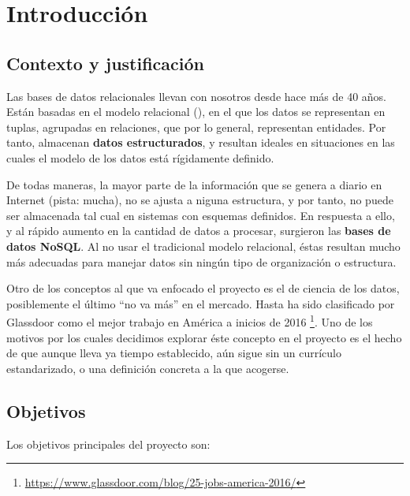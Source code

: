 \section{Introducción}
\label{sec:aim}

\subsection{Contexto y justificación}
\label{subsec:context}

Las bases de datos relacionales llevan con nosotros desde hace más de 40 años.
Están basadas en el modelo relacional (\cite{Codd:1970:RMD:362384.362685}), en el que los datos se representan en tuplas, agrupadas en
relaciones, que por lo general, representan entidades. Por tanto, almacenan
\textbf{datos estructurados}, y resultan ideales en situaciones en las cuales el
modelo de los datos está rígidamente definido.

De todas maneras, la mayor parte de la información que se genera a
diario en Internet (pista: mucha), no se ajusta a niguna estructura, y
por tanto, no puede ser almacenada tal cual en sistemas con esquemas definidos.
En respuesta a ello, y al rápido aumento en la cantidad de datos a procesar,
surgieron las \textbf{bases de datos NoSQL}. Al no usar el tradicional modelo
relacional, éstas resultan mucho más adecuadas para manejar datos sin ningún
tipo de organización o estructura. 

Otro de los conceptos al que va enfocado el proyecto es el de ciencia de los
datos, posiblemente el último ``no va más'' en el mercado. Hasta ha sido
clasificado por Glassdoor como el mejor trabajo en América a inicios de 2016
\footnote{\url{https://www.glassdoor.com/blog/25-jobs-america-2016/}}. Uno de
los motivos por los cuales decidimos explorar éste concepto en el proyecto es el
hecho de que aunque lleva ya tiempo establecido, aún sigue sin un currículo
estandarizado, o una definición concreta a la que acogerse.

\subsection{Objetivos}
\label{subsec:objectives}

Los objetivos principales del proyecto son:

